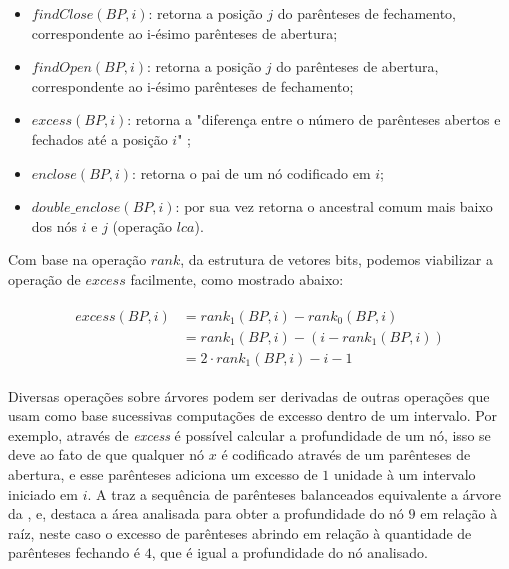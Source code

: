 \begin{itemize}
    \item $findClose(BP,i)$: retorna a posição $j$ do parênteses de fechamento, correspondente ao i-ésimo parênteses de abertura;
    \item $findOpen(BP, i)$: retorna a posição $j$ do parênteses de abertura, correspondente ao i-ésimo parênteses de fechamento;
    \item $excess(BP, i)$: retorna a "diferença entre o número de parênteses abertos e fechados até a posição $i$"  \cite[tradução nossa]{paper-succint-representation-of-balanced-parentheses};
    \item $enclose(BP,i)$: retorna o pai de um nó codificado em $i$;
    \item $double\_enclose(BP,i)$: por sua vez retorna o ancestral comum mais baixo dos nós $i$ e $j$ (operação $lca$).
\end{itemize}

Com base na operação  $rank$, da estrutura de vetores bits, podemos viabilizar a operação de $excess$ facilmente, como mostrado abaixo:

\begin{eqnarray*}
    \begin{split}
        excess(BP,i) &= rank_1(BP,i) - rank_0(BP,i) \\
        &  = rank_1(BP,i) - (i - rank_1(BP,i)) \\
        &  = 2 \cdot rank_1(BP,i) - i -1 
    \end{split}
\end{eqnarray*}

Diversas operações sobre árvores podem ser derivadas de outras operações que usam como base sucessivas computações de excesso dentro de um intervalo. Por exemplo, através de \textit{excess} é possível calcular a profundidade de um nó, isso se deve ao fato de que qualquer nó $x$ é codificado através de um parênteses de abertura, e esse parênteses adiciona um excesso de $1$ unidade à um intervalo iniciado em $i$. A  traz a sequência de parênteses balanceados equivalente a árvore da , e, destaca a área analisada para obter a profundidade do nó $9$ em relação à raíz, neste caso o excesso de parênteses abrindo em relação à quantidade de parênteses fechando é $4$, que é igual a profundidade do nó analisado.

